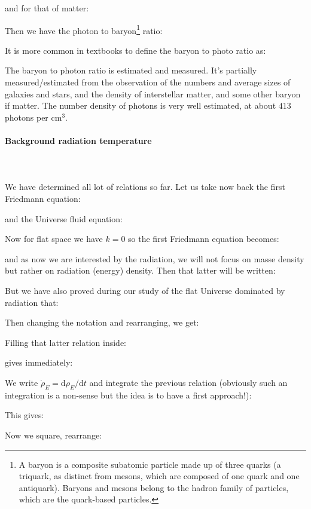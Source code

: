 	and for that of matter:
	
	Then we have the photon to baryon\footnote{A baryon is a composite subatomic particle made up of three quarks (a triquark, as distinct from mesons, which are composed of one quark and one antiquark). Baryons and mesons belong to the hadron family of particles, which are the quark-based particles.} ratio:
	
	\begin{tcolorbox}[title=Remark,colframe=black,arc=10pt]
	It is more common in textbooks to define the baryon to photo ratio as:
	
	The baryon to photon ratio is estimated and measured. It's partially measured/estimated from the observation of the numbers and average sizes of galaxies and stars, and the density of interstellar matter, and some other baryon if matter. The number density of photons is very well estimated, at about $413$ photons per $\text{cm}^3$.
	\end{tcolorbox}
	
	\paragraph{Background radiation temperature}\mbox{}\\\\
	We have determined all lot of relations so far. Let us take now back the first Friedmann equation:
	
	and the Universe fluid equation:
	
	Now for flat space we have $k=0$ so the first Friedmann equation becomes:
	
	and as now we are interested by the radiation, we will not focus on masse density but rather on radiation (energy) density. Then that latter will be written:
	
	But we have also proved during our study of the flat Universe dominated by radiation that:
	
	Then changing the notation and rearranging, we get:
	
	Filling that latter relation inside:
	
	gives immediately:
	
	We write $\dot{\rho}_E=\mathrm{d}\rho_E/\mathrm{d}t$ and integrate the previous relation (obviously such an integration is a non-sense but the idea is to have a first approach!):
	
	This gives:
	
	Now we square, rearrange:
	
